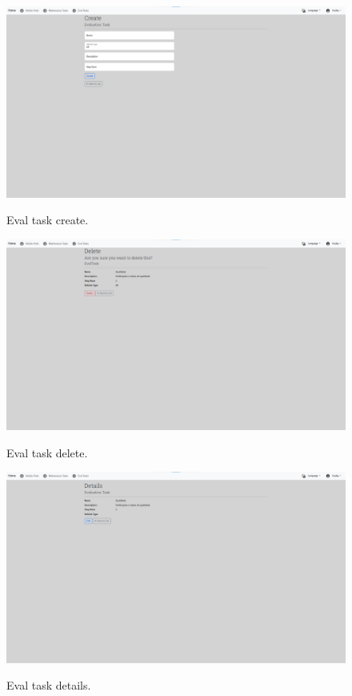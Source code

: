 \begin{figure}[htbp]
  \caption{Eval task create.}
  \centering
  \includegraphics[width=\textwidth]{figs/Implementation/dealershipAdmin/evalCreate}
  \label{fig:evalCreate}
\end{figure}

\begin{figure}[htbp]
  \caption{Eval task delete.}
  \centering
  \includegraphics[width=\textwidth]{figs/Implementation/dealershipAdmin/evalDelete}
  \label{fig:evalDelete}
\end{figure}

\begin{figure}[htbp]
  \caption{Eval task details.}
  \centering
  \includegraphics[width=\textwidth]{figs/Implementation/dealershipAdmin/evalDetails}
  \label{fig:evalDetails}
\end{figure}

